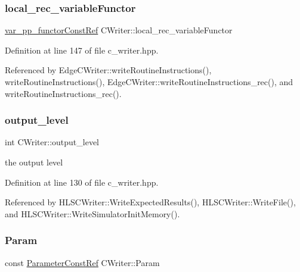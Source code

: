 \subsubsection{\texorpdfstring{local\+\_\+rec\+\_\+variable\+Functor}{local\_rec\_variableFunctor}}
{\footnotesize\ttfamily \hyperlink{var__pp__functor_8hpp_a8a6b51b6519401d911398943510557f0}{var\+\_\+pp\+\_\+functor\+Const\+Ref} C\+Writer\+::local\+\_\+rec\+\_\+variable\+Functor\hspace{0.3cm}{\ttfamily [protected]}}



Definition at line 147 of file c\+\_\+writer.\+hpp.



Referenced by Edge\+C\+Writer\+::write\+Routine\+Instructions(), write\+Routine\+Instructions(), Edge\+C\+Writer\+::write\+Routine\+Instructions\+\_\+rec(), and write\+Routine\+Instructions\+\_\+rec().

\mbox{\label{classCWriter_ae6a63f53399597601d3c0e34565d0bd3}} 
\subsubsection{\texorpdfstring{output\+\_\+level}{output\_level}}
{\footnotesize\ttfamily int C\+Writer\+::output\+\_\+level\hspace{0.3cm}{\ttfamily [protected]}}



the output level 



Definition at line 130 of file c\+\_\+writer.\+hpp.



Referenced by H\+L\+S\+C\+Writer\+::\+Write\+Expected\+Results(), H\+L\+S\+C\+Writer\+::\+Write\+File(), and H\+L\+S\+C\+Writer\+::\+Write\+Simulator\+Init\+Memory().

\mbox{\label{classCWriter_a3555d61ac3540440862ed211800b80be}} 
\subsubsection{\texorpdfstring{Param}{Param}}
{\footnotesize\ttfamily const \hyperlink{Parameter_8hpp_a37841774a6fcb479b597fdf8955eb4ea}{Parameter\+Const\+Ref} C\+Writer\+::\+Param\hspace{0.3cm}{\ttfamily [protected]}}



